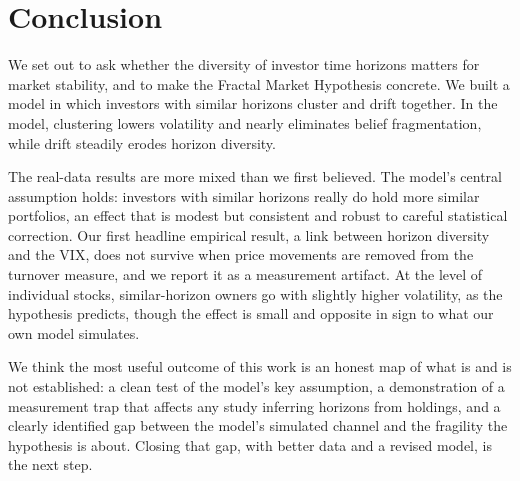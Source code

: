 \section{Conclusion}
\label{sec:conclusion}

We set out to ask whether the diversity of investor time horizons matters for market stability, and to make the Fractal Market Hypothesis concrete. We built a model in which investors with similar horizons cluster and drift together. In the model, clustering lowers volatility and nearly eliminates belief fragmentation, while drift steadily erodes horizon diversity.

The real-data results are more mixed than we first believed. The model's central assumption holds: investors with similar horizons really do hold more similar portfolios, an effect that is modest but consistent and robust to careful statistical correction. Our first headline empirical result, a link between horizon diversity and the VIX, does not survive when price movements are removed from the turnover measure, and we report it as a measurement artifact. At the level of individual stocks, similar-horizon owners go with slightly higher volatility, as the hypothesis predicts, though the effect is small and opposite in sign to what our own model simulates.

We think the most useful outcome of this work is an honest map of what is and is not established: a clean test of the model's key assumption, a demonstration of a measurement trap that affects any study inferring horizons from holdings, and a clearly identified gap between the model's simulated channel and the fragility the hypothesis is about. Closing that gap, with better data and a revised model, is the next step.
